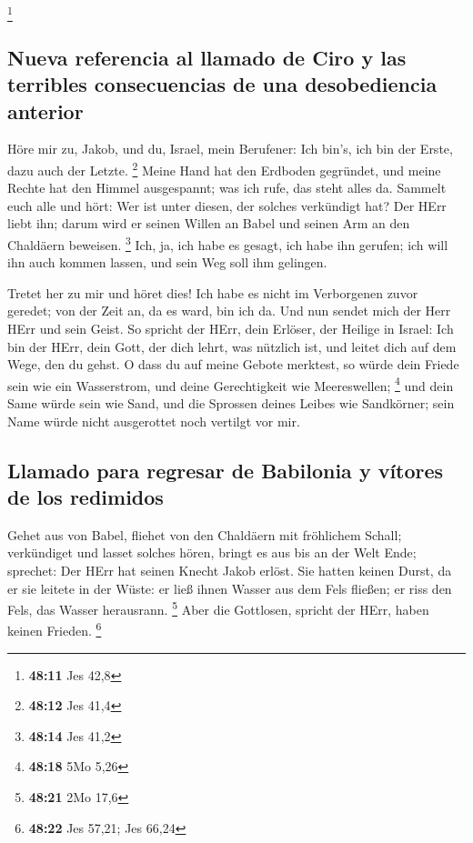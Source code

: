 \footnote{\textbf{48:11} Jes 42,8}

\hypertarget{nueva-referencia-al-llamado-de-ciro-y-las-terribles-consecuencias-de-una-desobediencia-anterior}{%
\subsection{Nueva referencia al llamado de Ciro y las terribles
consecuencias de una desobediencia
anterior}\label{nueva-referencia-al-llamado-de-ciro-y-las-terribles-consecuencias-de-una-desobediencia-anterior}}

 Höre mir zu, Jakob, und du, Israel, mein Berufener: Ich
bin's, ich bin der Erste, dazu auch der Letzte. \footnote{\textbf{48:12}
  Jes 41,4}  Meine Hand hat den Erdboden gegründet, und
meine Rechte hat den Himmel ausgespannt; was ich rufe, das steht alles
da.  Sammelt euch alle und hört: Wer ist unter diesen,
der solches verkündigt hat? Der HErr liebt ihn; darum wird er seinen
Willen an Babel und seinen Arm an den Chaldäern beweisen. \footnote{\textbf{48:14}
  Jes 41,2}  Ich, ja, ich habe es gesagt, ich habe ihn
gerufen; ich will ihn auch kommen lassen, und sein Weg soll ihm
gelingen.

 Tretet her zu mir und höret dies! Ich habe es nicht im
Verborgenen zuvor geredet; von der Zeit an, da es ward, bin ich da. Und
nun sendet mich der Herr HErr und sein Geist.  So spricht
der HErr, dein Erlöser, der Heilige in Israel: Ich bin der HErr, dein
Gott, der dich lehrt, was nützlich ist, und leitet dich auf dem Wege,
den du gehst.  O dass du auf meine Gebote merktest, so
würde dein Friede sein wie ein Wasserstrom, und deine Gerechtigkeit wie
Meereswellen; \footnote{\textbf{48:18} 5Mo 5,26}  und
dein Same würde sein wie Sand, und die Sprossen deines Leibes wie
Sandkörner; sein Name würde nicht ausgerottet noch vertilgt vor mir.

\hypertarget{llamado-para-regresar-de-babilonia-y-vuxedtores-de-los-redimidos}{%
\subsection{Llamado para regresar de Babilonia y vítores de los
redimidos}\label{llamado-para-regresar-de-babilonia-y-vuxedtores-de-los-redimidos}}

 Gehet aus von Babel, fliehet von den Chaldäern mit
fröhlichem Schall; verkündiget und lasset solches hören, bringt es aus
bis an der Welt Ende; sprechet: Der HErr hat seinen Knecht Jakob erlöst.
 Sie hatten keinen Durst, da er sie leitete in der Wüste:
er ließ ihnen Wasser aus dem Fels fließen; er riss den Fels, das Wasser
herausrann. \footnote{\textbf{48:21} 2Mo 17,6}  Aber die
Gottlosen, spricht der HErr, haben keinen Frieden. \footnote{\textbf{48:22}
  Jes 57,21; Jes 66,24}

